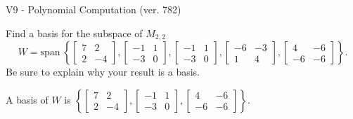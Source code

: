 \begin{exercise}
  \begin{exerciseTitle}V9 - Polynomial Computation (ver. 782)\end{exerciseTitle}
  \begin{exerciseStatement}
    Find a basis for the subspace of \(M_{2,2}\) 
\[W=\mathrm{span}\ \left\{\left[\begin{array}{cc}
7 & 2 \\
2 & -4
\end{array}\right] , \left[\begin{array}{cc}
-1 & 1 \\
-3 & 0
\end{array}\right] , \left[\begin{array}{cc}
-1 & 1 \\
-3 & 0
\end{array}\right] , \left[\begin{array}{cc}
-6 & -3 \\
1 & 4
\end{array}\right] , \left[\begin{array}{cc}
4 & -6 \\
-6 & -6
\end{array}\right]\right\}.\]
 Be sure to explain why your result is a basis.


  \end{exerciseStatement}
  \begin{exerciseAnswer}
   A basis of \(W\) is  \(\left\{\left[\begin{array}{cc}
7 & 2 \\
2 & -4
\end{array}\right] , \left[\begin{array}{cc}
-1 & 1 \\
-3 & 0
\end{array}\right] , \left[\begin{array}{cc}
4 & -6 \\
-6 & -6
\end{array}\right]\right\}\).
  


  \end{exerciseAnswer}
\end{exercise}